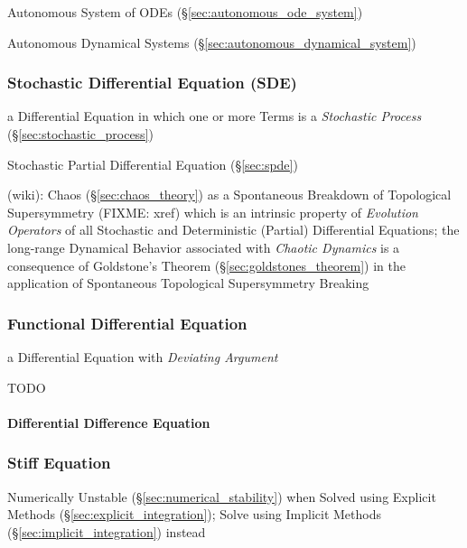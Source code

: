 \fist Autonomous System of ODEs (\S\ref{sec:autonomous_ode_system})

\fist Autonomous Dynamical Systems (\S\ref{sec:autonomous_dynamical_system})



\subsubsection{Stochastic Differential Equation (SDE)}\label{sec:sde}

a Differential Equation in which one or more Terms is a \emph{Stochastic
  Process} (\S\ref{sec:stochastic_process})

\fist Stochastic Partial Differential Equation (\S\ref{sec:spde})

(wiki): Chaos (\S\ref{sec:chaos_theory}) as a Spontaneous Breakdown of
Topological Supersymmetry (FIXME: xref) which is an intrinsic property of
\emph{Evolution Operators} of all Stochastic and Deterministic (Partial)
Differential Equations; the long-range Dynamical Behavior associated with
\emph{Chaotic Dynamics} is a consequence of Goldstone's Theorem
(\S\ref{sec:goldstones_theorem}) in the application of Spontaneous Topological
Supersymmetry Breaking



\subsubsection{Functional Differential Equation}\label{sec:fde}

a Differential Equation with \emph{Deviating Argument}

TODO



\paragraph{Differential Difference Equation}\label{sec:dde}\hfill



\subsubsection{Stiff Equation}\label{sec:stiff_equation}

Numerically Unstable (\S\ref{sec:numerical_stability}) when Solved using
Explicit Methods (\S\ref{sec:explicit_integration});
Solve using Implicit Methods (\S\ref{sec:implicit_integration}) instead



